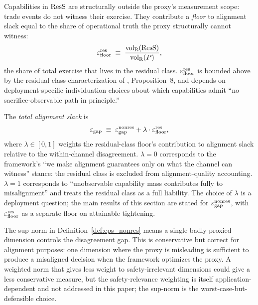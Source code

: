 \begin{definition}
\label{def:eps_floor}
Capabilities in $\mathrm{ResS}$ are structurally outside the proxy's
measurement scope: trade events do not witness their exercise.
They contribute a \emph{floor} to alignment slack equal to the share
of operational truth the proxy structurally cannot witness:
\[
  \varepsilon_{\mathrm{floor}}^{\mathrm{res}} \;\equiv\; \frac{{\operatorname{vol}_{\mathrm{R}}}(\mathrm{ResS})}{{\operatorname{vol}_{\mathrm{R}}}(P)},
\]
the share of total exercise that lives in the residual class.
$\varepsilon_{\mathrm{floor}}^{\mathrm{res}}$ is bounded above by the residual-class
characterization of
\citep[Need~Sufficiency]{lasser2026paper8b}, Proposition~8, and
depends on deployment-specific individuation choices about which
capabilities admit ``no sacrifice-observable path in principle.''
\end{definition}

\begin{definition}
\label{def:eps_gap}
The \emph{total alignment slack} is
\[
  \varepsilon_{\mathrm{gap}} \;\equiv\; \varepsilon_{\mathrm{gap}}^{\mathrm{nonres}} + \lambda \cdot \varepsilon_{\mathrm{floor}}^{\mathrm{res}},
\]
where $\lambda \in [0, 1]$ weights the residual-class floor's
contribution to alignment slack relative to the within-channel
disagreement.  $\lambda = 0$ corresponds to the framework's ``we
make alignment guarantees only on what the channel can witness''
stance: the residual class is excluded from alignment-quality
accounting.  $\lambda = 1$ corresponds to ``unobservable capability
mass contributes fully to misalignment'' and treats the residual
class as a full liability.  The choice of $\lambda$ is a deployment
question; the main results of this section are stated for
$\varepsilon_{\mathrm{gap}}^{\mathrm{nonres}}$, with $\varepsilon_{\mathrm{floor}}^{\mathrm{res}}$ as a separate floor on attainable
tightening.
\end{definition}

\begin{remark}
\label{rem:supnorm_conservative}
The sup-norm in Definition~\ref{def:eps_nonres} means a single
badly-proxied dimension controls the disagreement gap.  This is
conservative but correct for alignment purposes: one dimension
where the proxy is misleading is sufficient to produce a misaligned
decision when the framework optimizes the proxy.  A weighted norm
that gives less weight to safety-irrelevant dimensions could give
a less conservative measure, but the safety-relevance weighting is
itself application-dependent and not addressed in this paper; the
sup-norm is the worst-case-but-defensible choice.
\end{remark}

